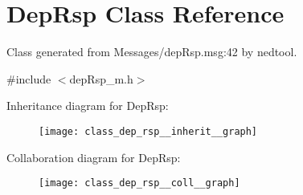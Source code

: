 \hypertarget{class_dep_rsp}{}\section{Dep\+Rsp Class Reference}
\label{class_dep_rsp}


Class generated from {\ttfamily Messages/dep\+Rsp.\+msg\+:42} by nedtool.  




{\ttfamily \#include $<$dep\+Rsp\+\_\+m.\+h$>$}



Inheritance diagram for Dep\+Rsp\+:
\nopagebreak
\begin{figure}[H]
\begin{center}
\leavevmode
\texttt{[image: class\_dep\_rsp\_\_inherit\_\_graph]}
\end{center}
\end{figure}


Collaboration diagram for Dep\+Rsp\+:
\nopagebreak
\begin{figure}[H]
\begin{center}
\leavevmode
\texttt{[image: class\_dep\_rsp\_\_coll\_\_graph]}
\end{center}
\end{figure}
